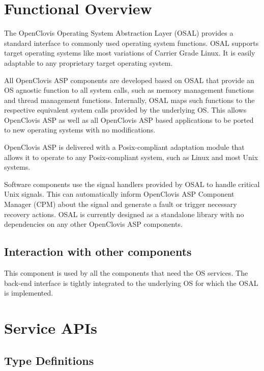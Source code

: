 \hypertarget{group__group29}{
\chapter{Functional Overview}
\label{group__group29}
}


The OpenClovis Operating System Abstraction Layer (OSAL) provides a standard interface to commonly used operating system functions. OSAL 
supports target operating systems like most variations of Carrier Grade Linux. It is easily adaptable to any proprietary target operating system. \par
 \par
 All OpenClovis ASP components are developed based on OSAL that provide an OS agnostic function to all system calls, such as memory management functions
 and thread management functions. Internally, OSAL maps such functions to the respective equivalent system calls provided by the underlying OS. This 
 allows OpenClovis ASP as well as all OpenClovis ASP based applications to be ported to new operating systems with no modifications. \par
 \par
 OpenClovis ASP is delivered with a Posix-compliant adaptation module that allows it to operate to any Posix-compliant system, such as Linux and most 
 Unix systems. \par
 \par
 Software components use the signal handlers provided by OSAL to handle critical Unix signals. This can automatically inform OpenClovis ASP Component
 Manager (CPM) about the signal and generate a fault or trigger necessary recovery actions. OSAL is currently designed as a standalone library with no 
 dependencies on any other OpenClovis ASP components.
\section{Interaction with other components} This component is used by all the components that need the OS services. The back-end interface is tightly 
integrated to the underlying OS for which the OSAL is implemented.



\chapter{Service APIs}

\section{Type Definitions}

